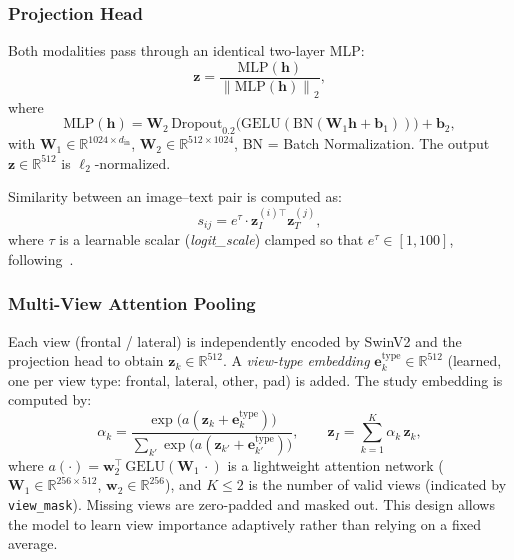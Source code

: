 \documentclass[11pt, a4paper]{article}
\newcommand{\vv}[1]{\mathbf{#1}}
\newcommand{\norm}[1]{\left\lVert#1\right\rVert}
\begin{document}
\subsubsection{Projection Head}

Both modalities pass through an identical two-layer MLP:
\begin{equation}
  \vv{z} = \frac{\text{MLP}(\vv{h})}{\norm{\text{MLP}(\vv{h})}_2},
  \label{eq:proj}
\end{equation}
where
\begin{equation}
  \text{MLP}(\vv{h}) =
    \vv{W}_2\,\text{Dropout}_{0.2}\!\bigl(
      \text{GELU}(\text{BN}(\vv{W}_1\vv{h}+\vv{b}_1))
    \bigr) + \vv{b}_2,
  \label{eq:mlp}
\end{equation}
with $\vv{W}_1\!\in\!\mathbb{R}^{1024\times d_{\mathrm{in}}}$,
$\vv{W}_2\!\in\!\mathbb{R}^{512\times 1024}$, BN = Batch Normalization.
The output $\vv{z}\!\in\!\mathbb{R}^{512}$ is $\ell_2$-normalized.

Similarity between an image--text pair is computed as:
\begin{equation}
  s_{ij} = e^{\tau} \cdot \vv{z}_I^{(i)\top} \vv{z}_T^{(j)},
  \label{eq:sim}
\end{equation}
where $\tau$ is a learnable scalar (\emph{logit\_scale}) clamped so that
$e^{\tau}\in[1,100]$, following~\citet{radford2021learning}.

\subsubsection{Multi-View Attention Pooling}

Each view (frontal / lateral) is independently encoded by SwinV2 and the
projection head to obtain $\vv{z}_k\in\mathbb{R}^{512}$.
A \emph{view-type embedding} $\vv{e}_k^{\mathrm{type}}\in\mathbb{R}^{512}$
(learned, one per view type: frontal, lateral, other, pad) is added.
The study embedding is computed by:
\begin{equation}
  \alpha_k =
    \frac{\exp\!\bigl(a(\vv{z}_k+\vv{e}_k^{\mathrm{type}})\bigr)}
         {\sum_{k'}\exp\!\bigl(a(\vv{z}_{k'}+\vv{e}_{k'}^{\mathrm{type}})\bigr)},
  \qquad
  \vv{z}_I = \sum_{k=1}^{K}\alpha_k\,\vv{z}_k,
  \label{eq:attn}
\end{equation}
where $a(\cdot) = \vv{w}_2^{\top}\,\text{GELU}(\vv{W}_1\,\cdot)$ is a
lightweight attention network ($\vv{W}_1\!\in\!\mathbb{R}^{256\times512}$,
$\vv{w}_2\!\in\!\mathbb{R}^{256}$), and $K\!\leq\!2$ is the number of valid
views (indicated by \texttt{view\_mask}).
Missing views are zero-padded and masked out.
This design allows the model to learn view importance adaptively rather
than relying on a fixed average.
\end{document}
